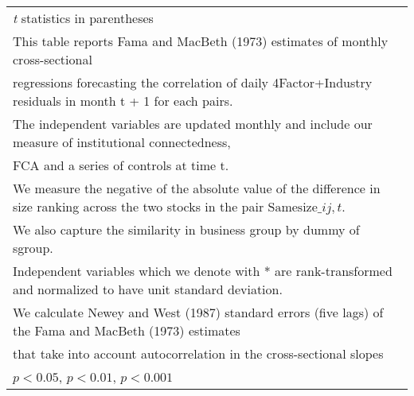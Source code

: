{\begin{tabular}{l*{2}{c}}
\hline\hline
\multicolumn{3}{l}{\footnotesize \textit{t} statistics in parentheses}\\
\multicolumn{3}{l}{\footnotesize This table reports Fama and MacBeth (1973) estimates of monthly cross-sectional}\\
\multicolumn{3}{l}{\footnotesize  regressions forecasting the correlation of daily 4Factor+Industry residuals in month t + 1 for each pairs.}\\
\multicolumn{3}{l}{\footnotesize The independent variables are updated monthly and include our measure of institutional connectedness,}\\
\multicolumn{3}{l}{\footnotesize  FCA and a series of controls at time t.}\\
\multicolumn{3}{l}{\footnotesize We measure the negative of the absolute value of the difference in size ranking across the two stocks in the pair $ \text{Samesize}\_{ij,t} $.}\\
\multicolumn{3}{l}{\footnotesize We also capture the similarity in business group by dummy of sgroup.}\\
\multicolumn{3}{l}{\footnotesize Independent variables which  we denote with * are rank-transformed and normalized to have unit standard deviation.}\\
\multicolumn{3}{l}{\footnotesize  We calculate Newey and West (1987) standard errors (five lags) of the Fama and MacBeth (1973) estimates }\\
\multicolumn{3}{l}{\footnotesize  that take into account autocorrelation in the cross-sectional slopes}\\
\multicolumn{3}{l}{\footnotesize \sym{*} \(p<0.05\), \sym{**} \(p<0.01\), \sym{***} \(p<0.001\)}\\
\end{tabular}
}
